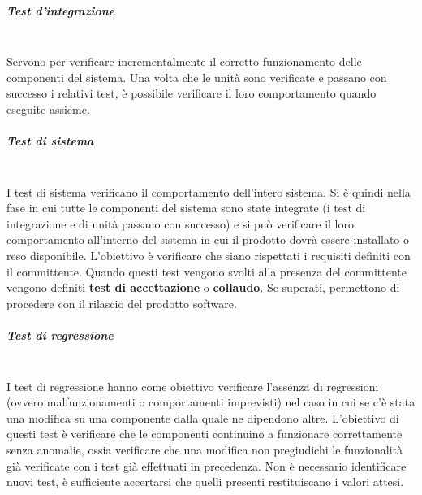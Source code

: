 \subparagraph{Test d’integrazione} \mbox{}\\
Servono per verificare incrementalmente il corretto funzionamento delle componenti del sistema.
Una volta che le unità sono verificate e passano con successo i relativi test, è possibile verificare il loro comportamento quando eseguite assieme.

\subparagraph{Test di sistema} \mbox{}\\
I test di sistema verificano il comportamento dell’intero sistema.
Si è quindi nella fase in cui tutte le componenti del sistema sono state integrate (i test di integrazione e di unità passano con successo) e si può verificare il loro comportamento all’interno del sistema in cui il prodotto dovrà essere installato o reso disponibile.
L'obiettivo è verificare che siano rispettati i requisiti definiti con il committente.
Quando questi test vengono svolti alla presenza del committente vengono definiti \textbf{test di accettazione} o \textbf{collaudo}. Se superati, permettono di procedere con il rilascio del prodotto software.

\subparagraph{Test di regressione} \mbox{}\\
I test di regressione hanno come obiettivo verificare l'assenza di regressioni (ovvero malfunzionamenti o comportamenti imprevisti) nel caso in cui se c’è stata una modifica su una componente dalla quale ne dipendono altre.
L'obiettivo di questi test è verificare che le componenti continuino a funzionare correttamente senza anomalie, ossia verificare che una modifica non pregiudichi le funzionalità già verificate con i test già effettuati in precedenza.
Non è necessario identificare nuovi test, è sufficiente accertarsi che quelli presenti restituiscano i valori attesi.

